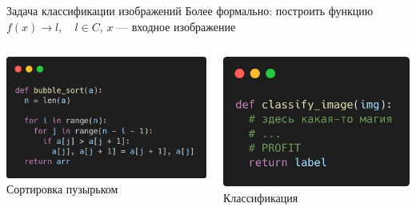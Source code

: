 \documentclass[aspectratio=169, professionalfonts]{beamer}
\begin{document}
\begin{frame}{Задача классификации изображений}
    Более формально: построить функцию
    \( f(x) \rightarrow l, \quad l \in C \), \(x\) --- входное изображение
    \vfill
    \begin{columns}
        \begin{column}{.49\linewidth}
            \centering
            \includegraphics[width=\linewidth]{graphs/fig9_1.jpg}
            Сортировка пузырьком
        \end{column}
        \begin{column}{.43\linewidth}
            \centering
            \includegraphics[width=\linewidth]{graphs/fig9_2.jpg}
            Классификация
        \end{column}
    \end{columns}
\end{frame}
\end{document}
